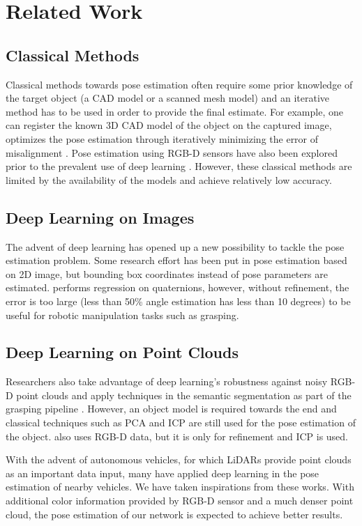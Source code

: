 \documentclass[conference]{IEEEtran}
\begin{document}
\section{Related Work}
\subsection{Classical Methods}
Classical methods towards pose estimation often require some prior knowledge of the target object (a CAD model or a scanned mesh model) and an iterative method has to be used in order to provide the final estimate. For example,  one can register the known 3D CAD model of the object on the captured image, optimizes the pose estimation through iteratively minimizing the error of misalignment \cite{jayawardena_2011_dicta}. Pose estimation using RGB-D sensors have also been explored prior to the prevalent use of deep learning \cite{choi_2012_iros}. However, these classical methods are limited by the availability of the models and achieve relatively low accuracy.


\subsection{Deep Learning on Images}
The advent of deep learning has opened up a new possibility to tackle the pose estimation problem. Some research effort has been put in pose estimation based on 2D image\cite{tremblay_2018_corl}, but bounding box coordinates instead of pose parameters are estimated. \cite{xiang_2018_rss} performs regression on quaternions, however, without refinement, the error is too large (less than 50\% angle estimation has less than 10 degrees) to be useful for robotic manipulation tasks such as grasping.

\subsection{Deep Learning on Point Clouds}
Researchers also take advantage of deep learning's robustness against noisy RGB-D point clouds and apply techniques in the semantic segmentation as part of the grasping pipeline \cite{mahler_2016_iros}\cite{zeng_2017_icra}\cite{wong_2017_iros}. However, an object model is required towards the end and classical techniques such as PCA and ICP are still used for the pose estimation of the object. \cite{xiang_2018_rss} also uses RGB-D data, but it is only for refinement and ICP is used.

With the advent of autonomous vehicles, for which LiDARs provide point clouds as an important data input, many have applied deep learning in the pose estimation of nearby vehicles. \cite{chen_2017_cvpr} We have taken inspirations from these works. With additional color information provided by RGB-D sensor and a much denser point cloud, the pose estimation of our network is expected to achieve better results.
\end{document}
